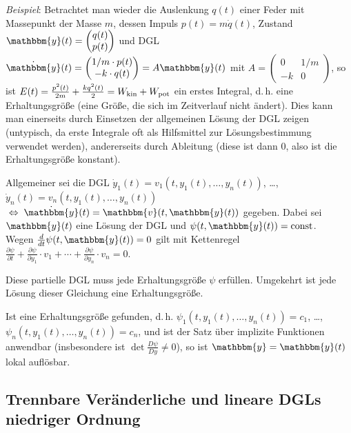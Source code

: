 \emph{Beispiel}:
Betrachtet man wieder die Auslenkung $q(t)$ einer Feder mit
Massepunkt der Masse $m$, dessen Impuls $p(t) = m \dot{q}(t)$, Zustand
$\mathbbm{y}(t) = \begin{pmatrix}q(t) \\ p(t)\end{pmatrix}$ und DGL
$\dot{\mathbbm{y}}(t)
= \begin{pmatrix}1/m \cdot p(t) \\ -k \cdot q(t)\end{pmatrix} =
A \mathbbm{y}(t)$ mit $A = \begin{pmatrix}0 & 1/m \\ -k & 0\end{pmatrix}$,
so ist $E(t) = \frac{p^2(t)}{2m} + \frac{kq^2(t)}{2} = W_{{\operatorname{kin}}} + W_{{\operatorname{pot}}}$
ein erstes Integral, d.\,h.
eine Erhaltungsgröße (eine Größe, die sich im Zeitverlauf nicht ändert).
Dies kann man einerseits durch Einsetzen der allgemeinen Lösung der DGL
zeigen (untypisch, da erste Integrale oft als Hilfsmittel zur Lösungsbestimmung
verwendet werden), andererseits durch Ableitung (diese ist dann $0$, also
ist die Erhaltungsgröße konstant).

Allgemeiner sei die DGL
$\dot{y}_1(t) = v_1(t, y_1(t), \dotsc, y_n(t))$, \dots,
$\dot{y}_n(t) = v_n(t, y_1(t), \dotsc, y_n(t))$
$\;\Leftrightarrow\; \dot{\mathbbm{y}}(t) = \mathbbm{v}(t, \mathbbm{y}(t))$
gegeben.
Dabei sei $\mathbbm{y}(t)$ eine Lösung der DGL und
$\psi(t, \mathbbm{y}(t)) = \const$. \\
Wegen $\frac{d}{dt} \psi(t, \mathbbm{y}(t)) = 0$
gilt mit Kettenregel
$\frac{\partial \psi}{\partial t} +
\frac{\partial \psi}{\partial y_1} \cdot v_1 +
\dotsb + \frac{\partial \psi}{\partial y_n} \cdot v_n = 0$.

Diese partielle DGL muss jede Erhaltungsgröße $\psi$ erfüllen.
Umgekehrt ist jede Lösung dieser Gleichung eine Erhaltungsgröße.

Ist eine Erhaltungsgröße gefunden, d.\,h.
$\psi_1(t, y_1(t), \dotsc, y_n(t)) = c_1$, \dots, \\
$\psi_n(t, y_1(t), \dotsc, y_n(t)) = c_n$,
und ist der Satz über implizite Funktionen anwendbar
(insbesondere ist $\det \frac{D \psi}{D y} \not= 0$), so ist
$\mathbbm{y} = \mathbbm{y}(t)$ lokal auflösbar.

\pagebreak

\subsection{%
    Trennbare Veränderliche und lineare DGLs niedriger Ordnung%
}


